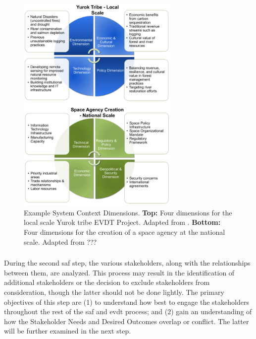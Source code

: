 \begin{figure}[!htb] 
\centering
\includegraphics[width=0.7\textwidth]{Figures/chap3/dimensions_examples.png}
\caption[Example System Context Dimensions]{Example System Context Dimensions. \textbf{Top:} Four dimensions for the local scale Yurok tribe EVDT Project. Adapted from \cite{lombardoDevelopmentDecisionSupport2021}. \textbf{Bottom:} Four dimensions for the creation of a space agency at the national scale. Adapted from ???}
\label{fig:dimensions_example}
\end{figure} 


\subsubsection{} \label{sec:saf_stakeholders}

During the second \ac{saf} step, the various stakeholders, along with the relationships between them, are analyzed. This process may result in the identification of additional stakeholders or the decision to exclude stakeholders from consideration, though the latter should not be done lightly. The primary objectives of this step are (1) to understand how best to engage the stakeholders throughout the rest of the \ac{saf} and \ac{evdt} process; and (2) gain an understanding of how the Stakeholder Needs and Desired Outcomes overlap or conflict. The latter will be further examined in the next step.

